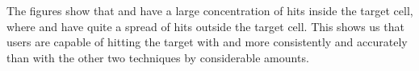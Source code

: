 The figures show that \swipe and \throw have a large concentration of hits inside the target cell, where \pinch and \tilt have quite a spread of hits outside the target cell. 
This shows us that users are capable of hitting the target with \swipe and \throw more consistently and accurately than with the other two techniques by considerable amounts.


\begin{figure}[H]
	\centering
	 \\ 

\end{figure}
